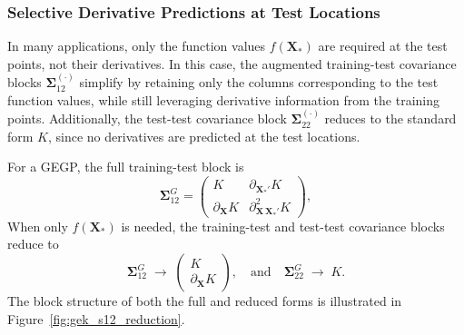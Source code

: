\documentclass[12pt]{article}
\begin{document}
\subsubsection{Selective Derivative Predictions at Test Locations}
\label{subsec:selective_deriv_pred}
In many applications, only the function values $f(\mathbf{X}_*)$ are required at the test points, not their derivatives. In this case, the augmented training-test covariance blocks $\boldsymbol{\Sigma}_{12}^{(\cdot)}$ simplify by retaining only the columns corresponding to the test function values, while still leveraging derivative information from the training points. Additionally, the test-test covariance block $\boldsymbol{\Sigma}_{22}^{(\cdot)}$ reduces to the standard form $K$, since no derivatives are predicted at the test locations.

For a GEGP, the full training-test block is
\begin{equation}
	\boldsymbol{\Sigma}_{12}^{G} =
	\begin{pmatrix}
		K & \partial_{\mathbf{X}_*'} K \\
		\partial_{\mathbf{X}} K & \partial^2_{\mathbf{X}\,\mathbf{X}_*'} K
	\end{pmatrix},
\end{equation}
When only $f(\mathbf{X}_*)$ is needed, the training-test and test-test covariance blocks reduce to
\begin{equation}
	\boldsymbol{\Sigma}_{12}^{G} \;\longrightarrow\;
	\begin{pmatrix}
		K \\
		\partial_{\mathbf{X}} K
	\end{pmatrix}, \quad \text{and} \quad
	\boldsymbol{\Sigma}_{22}^{G} \;\longrightarrow\; K.
\end{equation}
The block structure of both the full and reduced forms is illustrated in Figure~\ref{fig:gek_s12_reduction}.
\end{document}

